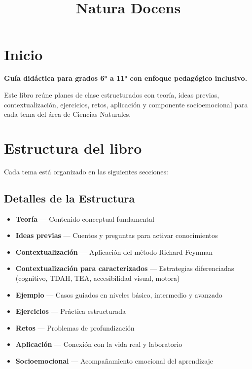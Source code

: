\documentclass[
  spanish,
  letterpaper,
  12pt,
  oneside,
  open=any,
  DIV=15]{scrbook}
\title{Natura Docens}
\author{}
\date{}
\providecommand{\tightlist}{%
  \setlength{\itemsep}{0pt}\setlength{\parskip}{0pt}}
\renewcommand*\contentsname{Contenido}
\newcommand\contentsname{Contenido}
\begin{document}
\frontmatter
\maketitle

\renewcommand*\contentsname{Contenido}
{
\setcounter{tocdepth}{0}
\tableofcontents
}

\mainmatter
\chapter{Inicio}\label{inicio}

\textbf{Guía didáctica para grados 6° a 11° con enfoque pedagógico
inclusivo.}

Este libro reúne planes de clase estructurados con teoría, ideas
previas, contextualización, ejercicios, retos, aplicación y componente
socioemocional para cada tema del área de Ciencias Naturales.

\chapter{Estructura del libro}\label{estructura-del-libro}

Cada tema está organizado en las siguientes secciones:

\section{Detalles de la Estructura}\label{detalles-de-la-estructura}

\begin{itemize}
\tightlist
\item
  \textbf{Teoría} --- Contenido conceptual fundamental
\item
  \textbf{Ideas previas} --- Cuentos y preguntas para activar
  conocimientos
\item
  \textbf{Contextualización} --- Aplicación del método Richard Feynman
\item
  \textbf{Contextualización para caracterizados} --- Estrategias
  diferenciadas (cognitivo, TDAH, TEA, accesibilidad visual, motora)
\item
  \textbf{Ejemplo} --- Casos guiados en niveles básico, intermedio y
  avanzado
\item
  \textbf{Ejercicios} --- Práctica estructurada
\item
  \textbf{Retos} --- Problemas de profundización
\item
  \textbf{Aplicación} --- Conexión con la vida real y laboratorio
\item
  \textbf{Socioemocional} --- Acompañamiento emocional del aprendizaje
\end{itemize}
\end{document}
